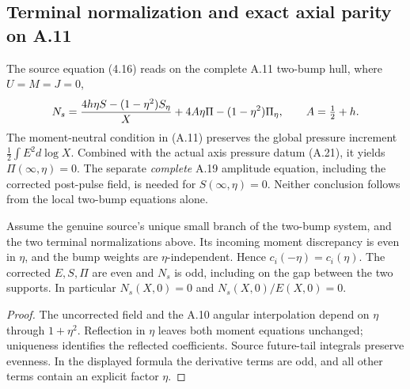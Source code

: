 \subsection*{Terminal normalization and exact axial parity on A.11}
\label{subsec:A11-parity-terminal-20261021}
The source equation (4.16) reads on the complete A.11 two-bump hull,
where $U=M=J=0$,
\[
N_s={4h\eta S-(1-\eta^2)S_\eta\over X}
 +4A\eta\Pi-(1-\eta^2)\Pi_\eta,\qquad A=\tfrac12+h.
\]
The moment-neutral condition in (A.11) preserves the global pressure
increment $\frac12\int E^2d\log X$. Combined with the actual axis
pressure datum (A.21), it yields $\Pi(\infty,\eta)=0$. The
separate \emph{complete} A.19 amplitude equation, including the
corrected post-pulse field, is needed for $S(\infty,\eta)=0$.
Neither conclusion follows from the local two-bump equations alone.

\begin{lemma}
\label{lem:A11-exact-parity-20261021}
Assume the genuine source's unique small branch of the two-bump
system, and the two terminal normalizations above. Its incoming
moment discrepancy is even in $\eta$, and the bump weights are
$\eta$-independent. Hence $c_i(-\eta)=c_i(\eta)$.
The corrected $E,S,\Pi$ are even and $N_s$ is odd, including on
the gap between the two supports. In particular $N_s(X,0)=0$
and $N_s(X,0)/E(X,0)=0$.
\end{lemma}
\begin{proof}
The uncorrected field and the A.10 angular interpolation depend
on $\eta$ through $1+\eta^2$. Reflection in $\eta$ leaves
both moment equations unchanged; uniqueness identifies the reflected
coefficients. Source future-tail integrals preserve evenness.
In the displayed formula the derivative terms are odd, and
all other terms contain an explicit factor $\eta$.
\end{proof}

